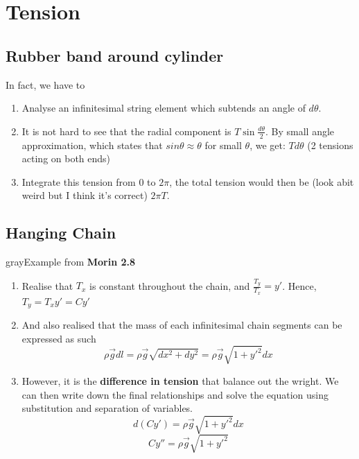 \section{Tension}
\subsection{Rubber band around cylinder}
In fact, we have to
\begin{enumerate}
    \item Analyse an infinitesimal string element which subtends an angle of $d\theta$.
    \item It is not hard to see that the radial component is $T\sin\frac{d\theta}{2}$. By small angle approximation, which states that $sin\theta \approx \theta$ for small $\theta$, we get: $Td\theta$ (2 tensions acting on both ends)
    \item Integrate this tension from $0$ to $2 \pi $, the total tension would then be (look abit weird but I think it's correct) $2 \pi T$.
\end{enumerate}

\subsection{Hanging Chain}
\begin{mybox}{gray}{Example from \textbf{Morin 2.8}}
    \begin{enumerate}
        \item Realise that $T_x$ is constant throughout the chain, and $\frac{T_y}{T_x}=y'$. Hence, $T_y=T_x y' = C y'$
        \item And also realised that the mass of each infinitesimal chain segments can be expressed as such
              \begin{equation}
                  \rho \vec{g} dl= \rho \vec{g} \sqrt {dx^2+dy^2}=\rho \vec{g} \sqrt {1+y'^2}dx
              \end{equation}
        \item However, it is the \textbf{difference in tension} that balance out the wright. We can then write down the final relationships and solve the equation using substitution and separation of variables.
              \begin{equation}
                  d(Cy')= \rho \vec{g} \sqrt {1+y'^2}dx
              \end{equation}
              \begin{equation}
                  C y''= \rho \vec{g} \sqrt {1+y'^2}
              \end{equation}
    \end{enumerate}
\end{mybox}

